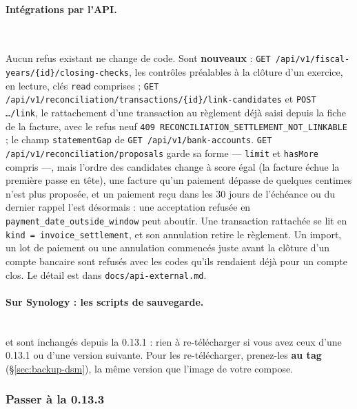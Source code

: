 \documentclass[a4paper,11pt,oneside]{article}
\begin{document}
\paragraph{Intégrations par l'API.}\mbox{}\\
\begin{sloppypar}
Aucun refus existant ne change de code. Sont \textbf{nouveaux} : \texttt{GET /api/v1/fiscal-years/\{id\}/closing-checks}, les contrôles préalables à la clôture d'un exercice, en lecture, clés \texttt{read} comprises ; \texttt{GET /api/v1/reconciliation/transactions/\{id\}/link-candidates} et \texttt{POST …/link}, le rattachement d'une transaction au règlement déjà saisi depuis la fiche de la facture, avec le refus neuf \texttt{409 RECONCILIATION\_SETTLEMENT\_NOT\_LINKABLE} ; le champ \texttt{statementGap} de \texttt{GET /api/v1/bank-accounts}. \texttt{GET /api/v1/reconciliation/proposals} garde sa forme --- \texttt{limit} et \texttt{hasMore} compris ---, mais l'ordre des candidates change à score égal (la facture échue la première passe en tête), une facture qu'un paiement dépasse de quelques centimes n'est plus proposée, et un paiement reçu dans les 30 jours de l'échéance ou du dernier rappel l'est désormais : une acceptation refusée en \texttt{payment\_date\_outside\_window} peut aboutir. Une transaction rattachée se lit en \texttt{kind = invoice\_settlement}, et son annulation retire le règlement. Un import, un lot de paiement ou une annulation commencés juste avant la clôture d'un compte bancaire sont refusés avec les codes qu'ils rendaient déjà pour un compte clos. Le détail est dans \texttt{docs/api-external.md}.
\end{sloppypar}

\paragraph{Sur Synology : les scripts de sauvegarde.}\mbox{}\\
 et  sont inchangés depuis la 0.13.1 : rien à re-télécharger si vous avez ceux d'une 0.13.1 ou d'une version suivante. Pour les re-télécharger, prenez-les \textbf{au tag } (\S\ref{sec:backup-dsm}), la même version que l'image de votre compose.

\subsubsection{Passer à la 0.13.3}\label{sec:maj-0-13-3}
\end{document}
